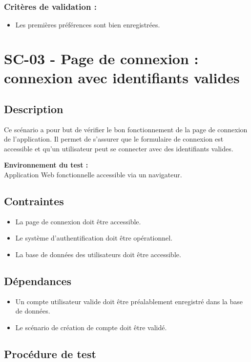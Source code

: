 \documentclass[a4paper,12pt]{report}
\begin{document}
\subsubsection{Critères de validation :}
\begin{itemize}
    \item Les premières préférences sont bien enregistrées.
\end{itemize}
\newpage

\section{SC-03 - Page de connexion : connexion avec identifiants valides}
\label{Co2}
\subsection*{Description}
Ce scénario a pour  but de vérifier le bon fonctionnement de la page de connexion de l’application.
Il permet de s’assurer que le formulaire de connexion est accessible et qu'un utilisateur peut se connecter avec des identifiants valides.

\textbf{Environnement du test :}\\
Application Web fonctionnelle accessible via un navigateur.
\subsection*{Contraintes}
\begin{itemize}
    \item La page de connexion doit être accessible.
    \item Le système d’authentification doit être opérationnel.
    \item La base de données des utilisateurs doit être accessible.
\end{itemize}

\subsection*{Dépendances}

\begin{itemize}
    \item Un compte utilisateur valide doit être préalablement enregistré dans la base de données.
    \item Le scénario de création de compte doit être validé.
\end{itemize}
\subsection*{Procédure de test}
\end{document}
